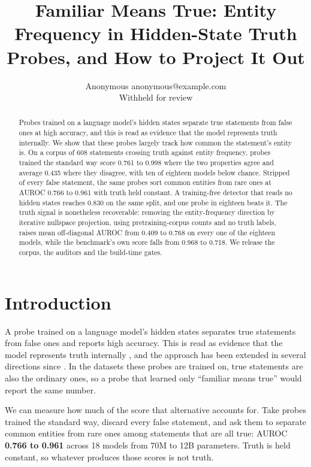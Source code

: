 \documentclass[10pt]{article}
\title{Familiar Means True: Entity Frequency in Hidden-State Truth Probes, and How to Project It Out}
\author{\name Anonymous \email anonymous@example.com \\
      \addr Withheld for review}
\begin{document}
\maketitle

\begin{abstract}

Probes trained on a language model's hidden states separate true statements from false ones at high accuracy, and this is read as evidence that the model represents truth internally. We show that these probes largely track how common the statement's entity is. On a corpus of 608 statements crossing truth against entity frequency, probes trained the standard way score 0.761 to 0.998 where the two properties agree and average 0.435 where they disagree, with ten of eighteen models below chance. Stripped of every false statement, the same probes sort common entities from rare ones at AUROC 0.766 to 0.961 with truth held constant. A training-free detector that reads no hidden states reaches 0.830 on the same split, and one probe in eighteen beats it. The truth signal is nonetheless recoverable: removing the entity-frequency direction by iterative nullspace projection, using pretraining-corpus counts and no truth labels, raises mean off-diagonal AUROC from 0.409 to 0.768 on every one of the eighteen models, while the benchmark's own score falls from 0.968 to 0.718. We release the corpus, the auditors and the build-time gates.

\end{abstract}
\section{Introduction}

A probe trained on a language model's hidden states separates true statements from false ones and reports high accuracy. This is read as evidence that the model represents truth internally \citep{azaria2023internal}, and the approach has been extended in several directions since \citep{marks2023geometry,burns2023discovering,burger2024truth}. In the datasets these probes are trained on, true statements are also the ordinary ones, so a probe that learned only ``familiar means true'' would report the same number.

We can measure how much of the score that alternative accounts for. Take probes trained the standard way, discard every false statement, and ask them to separate common entities from rare ones among statements that are all true: AUROC \textbf{0.766 to 0.961} across 18 models from 70M to 12B parameters. Truth is held constant, so whatever produces those scores is not truth.
\end{document}
